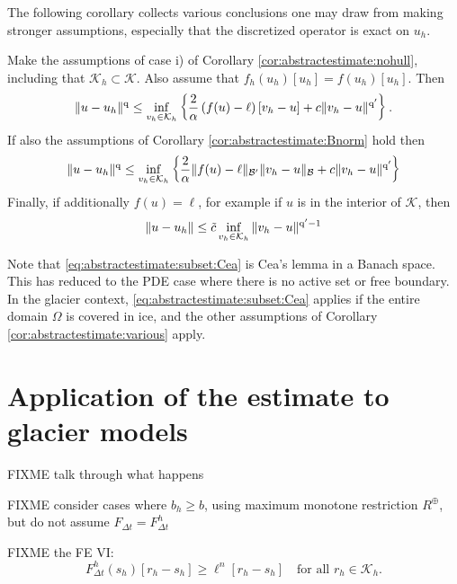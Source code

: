 \documentclass[hidelinks,onefignum,onetabnum,final]{siamart220329}  %
\newcommand{\cB}{\mathcal{B}}
\newcommand{\cK}{\mathcal{K}}
\newcommand{\qq}{{\text{\textnormal{q}}}}
\begin{document}
The following corollary collects various conclusions one may draw from making stronger assumptions, especially that the discretized operator is exact on $u_h$.

\begin{corollary}  \label{cor:abstractestimate:various}  Make the assumptions of case i) of Corollary \ref{cor:abstractestimate:nohull}, including that $\cK_h \subset \cK$.  Also assume that $f_h(u_h)[u_h] = f(u_h)[u_h]$.  Then
\begin{equation}
\|u-u_h\|^\qq \le  \inf_{v_h\in\cK_h} \left\{\frac{2}{\alpha} \left(f(u)-\ell\right)[v_h-u] + c \|v_h - u\|^{\qq'}\right\}. \label{eq:abstractestimate:subset}
\end{equation}
If also the assumptions of Corollary \ref{cor:abstractestimate:Bnorm} hold then
\begin{equation}
\|u-u_h\|^\qq \le \inf_{v_h\in\cK_h} \left\{\frac{2}{\alpha} \|f(u)-\ell\|_{\cB'} \|v_h-u\|_{\cB} + c \|v_h-u\|^{\qq'}\right\} \label{eq:abstractestimate:subset:Bnorm}
\end{equation}
Finally, if additionally $f(u)=\ell$, for example if $u$ is in the interior of $\cK$, then
\begin{equation}
\|u-u_h\| \le \tilde c \inf_{v_h\in\cK_h} \|v_h-u\|^{\qq'-1} \label{eq:abstractestimate:subset:Cea}
\end{equation}
\end{corollary}

Note that \eqref{eq:abstractestimate:subset:Cea} is Cea's lemma \cite[Theorem 2.4.1]{Ciarlet2002} in a Banach space.  This has reduced to the PDE case where there is no active set or free boundary.  In the glacier context, \eqref{eq:abstractestimate:subset:Cea} applies if the entire domain $\Omega$ is covered in ice, and the other assumptions of Corollary \ref{cor:abstractestimate:various} apply.


\section{Application of the estimate to glacier models} \label{sec:application}

FIXME talk through what happens

FIXME consider cases where $b_h\ge b$, using maximum monotone restriction $R^\oplus$, but do not assume $F_{\Delta t}=F^h_{\Delta t}$

FIXME the FE VI:
\begin{equation}
F^h_{\Delta t}(s_h)[r_h-s_h] \ge \ell^n[r_h-s_h] \quad \text{for all } r_h \in \cK_h. \label{eq:fe:be:vi}
\end{equation}
\end{document}
